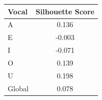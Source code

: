 \begin{tabular}{lc}
\toprule
\rowcolor{col01}
Vocal & Silhouette Score \\
\midrule
A & 0.136 \\
E & -0.003 \\
I & -0.071 \\
O & 0.139 \\
U & 0.198 \\
Global & 0.078 \\
\bottomrule
\end{tabular}
